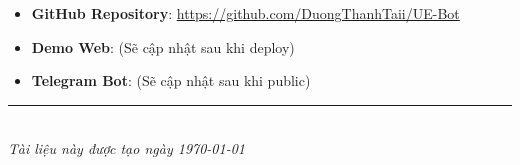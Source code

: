 \documentclass[12pt,a4paper]{article}
\begin{document}
\begin{itemize}
    \item \textbf{GitHub Repository}: \url{https://github.com/DuongThanhTaii/UE-Bot}
    \item \textbf{Demo Web}: (Sẽ cập nhật sau khi deploy)
    \item \textbf{Telegram Bot}: (Sẽ cập nhật sau khi public)
\end{itemize}

\vspace{2cm}

\begin{center}
    \rule{0.5\textwidth}{0.5pt}\\[0.5cm]
    \textit{Tài liệu này được tạo ngày \today}
\end{center}
\end{document}
